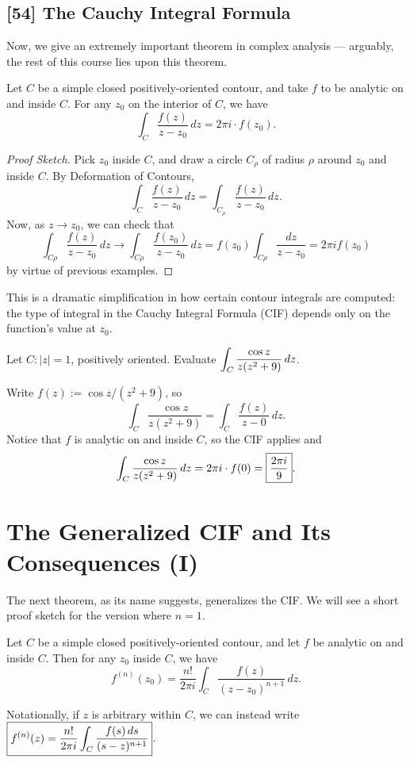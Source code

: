 \documentclass{article}
\begin{document}
\subsection*{[54] The Cauchy Integral Formula}
Now, we give an extremely important theorem in complex analysis --- arguably, the rest of this course lies upon this theorem.
\begin{theorem}
Let $C$ be a simple closed positively-oriented contour, and take $f$ to be analytic on and inside $C$. For any $z_0$ on the interior of $C$, we have
$$\int_C \frac{f(z)}{z-z_0}\, dz = 2\pi i \cdot f(z_0).$$
\end{theorem}
\begin{proof}[Proof Sketch]
Pick $z_0$ inside $C$, and draw a circle $C_\rho$ of radius $\rho$ around $z_0$ and inside $C$. By Deformation of Contours,
$$\int_C \frac{f(z)}{z-z_0}\, dz = \int_{C_\rho} \frac{f(z)}{z-z_0}\, dz.$$
Now, as $z \to z_0$, we can check that
$$\int_{C\rho} \frac{f(z)}{z-z_0}\, dz \to \int_{C\rho} \frac{f(z_0)}{z-z_0}\, dz = f(z_0) \int_{C\rho} \frac{dz}{z-z_0} = 2\pi i f(z_0)$$
by virtue of previous examples.
\end{proof}
This is a dramatic simplification in how certain contour integrals are computed: the type of integral in the Cauchy Integral Formula (CIF) depends only on the function's value at $z_0$.
\begin{example}
Let $C: |z|=1$, positively oriented. Evaluate $\displaystyle\int_C \frac{\cos z}{z(z^2+9)}\, dz$.
\end{example}
\begin{solution}
Write $f(z) := \cos z/(z^2+9)$, so
$$\int_C \frac{\cos z}{z(z^2+9)} = \int_C \frac{f(z)}{z-0}\, dz.$$
Notice that $f$ is analytic on and inside $C$, so the CIF applies and $$\displaystyle\int_C \frac{\cos z}{z(z^2 + 9)}\, dz  =2\pi i \cdot f(0) = \boxed{\frac{2\pi i}9}.$$
\end{solution}
\setcounter{section}{69}
\section{The Generalized CIF and Its Consequences (I)}
The next theorem, as its name suggests, generalizes the CIF. We will see a short proof sketch for the version where $n=1$.

\begin{theorem}
Let $C$ be a simple closed positively-oriented contour, and let $f$ be analytic on and inside $C$. Then for any $z_0$ inside $C$, we have
$$f^{(n)}(z_0) = \frac{n!}{2\pi i}\int_C \frac{f(z)}{(z-z_0)^{n+1}}\, dz.$$
\end{theorem}
Notationally, if $z$ is arbitrary within $C$, we can instead write $\displaystyle \boxed{f^{(n)}(z) = \frac{n!}{2\pi i}\int_C \frac{f(s)\, ds}{(s-z)^{n+1}}}$.
\end{document}
